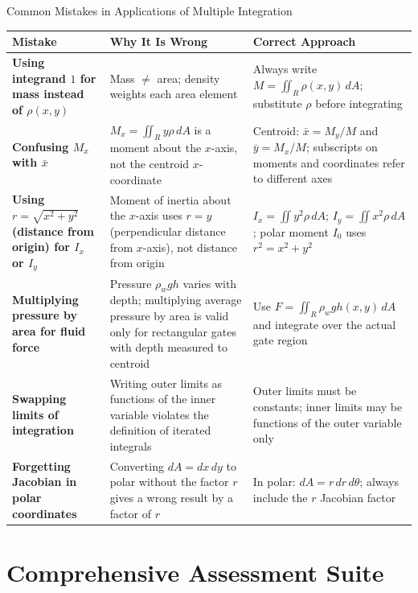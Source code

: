 \documentclass[12pt,a4paper]{article}
\begin{document}
\begin{mistakebox}{Common Mistakes in Applications of Multiple Integration}
\begin{tabular}{>{\bfseries}p{4cm} p{4.5cm} p{5cm}}
\toprule
Mistake & Why It Is Wrong & Correct Approach \\
\midrule
Using integrand \(1\) for mass instead of \(\rho(x,y)\) &
Mass \(\neq\) area; density weights each area element &
Always write \(M = \iint_R \rho(x,y)\,dA\); substitute \(\rho\) before integrating \\[6pt]
Confusing \(M_x\) with \(\bar{x}\) &
\(M_x = \iint_R y\rho\,dA\) is a moment about the \(x\)-axis, not the centroid \(x\)-coordinate &
Centroid: \(\bar{x} = M_y/M\) and \(\bar{y} = M_x/M\); subscripts on moments and coordinates refer to different axes \\[6pt]
Using \(r = \sqrt{x^2+y^2}\) (distance from origin) for \(I_x\) or \(I_y\) &
Moment of inertia about the \(x\)-axis uses \(r = y\) (perpendicular distance from \(x\)-axis), not distance from origin &
\(I_x = \iint y^2\rho\,dA\); \(I_y = \iint x^2\rho\,dA\); polar moment \(I_0\) uses \(r^2 = x^2+y^2\) \\[6pt]
Multiplying pressure by area for fluid force &
Pressure \(\rho_w g h\) varies with depth; multiplying average pressure by area is valid only for rectangular gates with depth measured to centroid &
Use \(F = \iint_R \rho_w g h(x,y)\,dA\) and integrate over the actual gate region \\[6pt]
Swapping limits of integration &
Writing outer limits as functions of the inner variable violates the definition of iterated integrals &
Outer limits must be constants; inner limits may be functions of the outer variable only \\[6pt]
Forgetting Jacobian in polar coordinates &
Converting \(dA = dx\,dy\) to polar without the factor \(r\) gives a wrong result by a factor of \(r\) &
In polar: \(dA = r\,dr\,d\theta\); always include the \(r\) Jacobian factor \\
\bottomrule
\end{tabular}
\end{mistakebox}

\section{Comprehensive Assessment Suite}
\end{document}
